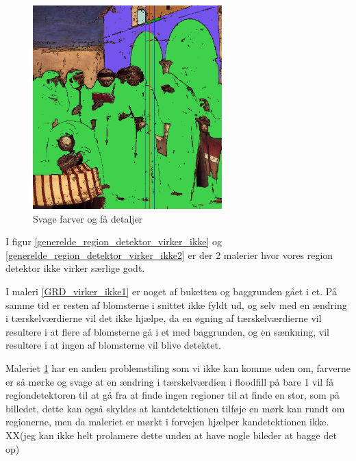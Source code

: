 \begin{figure}[!h]
    \centering
    \includegraphics[angle=0,width=0.65\textwidth]{afsnit/afprovning/billeder/thressholds/svage_farver/svage_detalier/floodfill/4-4.png}
    \caption{Svage farver og få detaljer}
    \label{GRD_virker_ikke2}
\end{figure}

I figur \ref{generelde_region_detektor_virker_ikke} og
\ref{generelde_region_detektor_virker_ikke2} er der 2 malerier hvor
vores region detektor ikke virker særlige godt. 

I maleri \ref{GRD_virker_ikke1} er noget af buketten og baggrunden gået
i et. På samme tid er resten af blomsterne i snittet ikke fyldt ud, og
selv med en ændring i tærskelværdierne vil det ikke hjælpe, da en øgning
af tærskelværdierne vil resultere i at flere af blomsterne gå i et med
baggrunden, og en sænkning, vil resultere i at ingen af blomsterne vil
blive detektet. 

Maleriet \ref{GRD_virker_ikke2} har en anden problemstiling som vi ikke
kan komme uden om, farverne er så mørke og svage at en ændring i
tærskelværdien i floodfill på bare 1 vil få regiondetektoren til at gå
fra at finde ingen regioner til at finde en stor, som på billedet, dette
kan også skyldes at kantdetektionen tilføje en mørk kan rundt om
regionerne, men da maleriet er mørkt i forvejen hjælper kandetektionen
ikke. XX(jeg kan ikke helt prolamere dette unden at have nogle bileder
at bagge det op)

